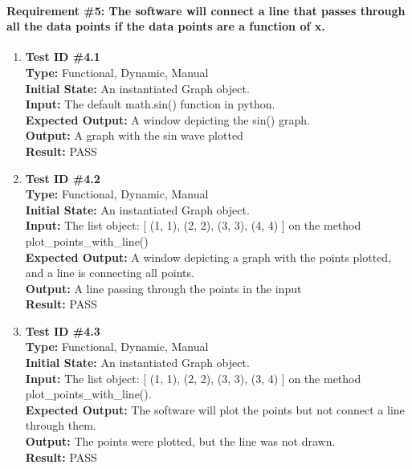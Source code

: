 \documentclass[12pt, titlepage]{article}
\begin{document}
	\paragraph{Requirement \#5: The software will connect a line that passes through all the data points if the data points are a function of x.}
		\begin{enumerate}
			\item{\textbf{Test ID \#4.1\\}}
			\textbf{Type:} Functional, Dynamic, Manual\\
			\textbf{Initial State:} An instantiated Graph object. \\
			\textbf{Input:} The default math.sin() function in python.\\
			\textbf{Expected Output:}  A window depicting the sin() graph.\\
			\textbf{Output:}	A graph with the sin wave plotted\\
			\textbf{Result:} PASS
					
			\item{\textbf{Test ID \#4.2\\}}
			\textbf{Type:} Functional, Dynamic, Manual\\
			\textbf{Initial State:} An instantiated Graph object.\\
			\textbf{Input:} The list object: [ (1, 1),  (2, 2), (3, 3), (4, 4) ] on the method plot\_points\_with\_line()\\
			\textbf{Expected Output:} A window depicting a graph with the points plotted, and a line is connecting all points. \\
			\textbf{Output:}	A line passing through the points in the input\\
			\textbf{Result:} PASS
				
			\item{\textbf{Test ID \#4.3\\}}
			\textbf{Type:} Functional, Dynamic, Manual\\
			\textbf{Initial State:}  An instantiated Graph object.\\
			\textbf{Input:} The list object: [ (1, 1),  (2, 2), (3, 3), (3, 4) ] on the method plot\_points\_with\_line().\\
			\textbf{Expected Output:} The software will plot the points but not connect a line through them.\\
			\textbf{Output:}	The points were plotted, but the line was not drawn.\\
			\textbf{Result:} PASS
	\end{enumerate}
	
\end{document}
